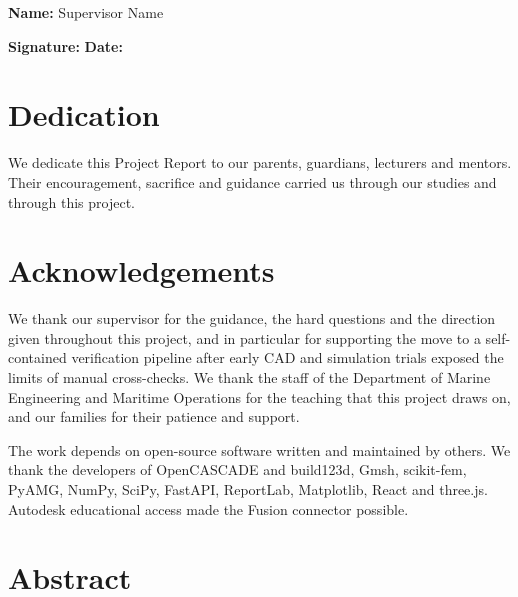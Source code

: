 \documentclass[12pt,a4paper]{report}
\begin{document}
\vspace{0.8cm}
\noindent
\textbf{Name:} Supervisor Name

\vspace{1cm}
\noindent
\textbf{Signature:} \underline{\hspace{5cm}}
\hfill
\textbf{Date:} \underline{\hspace{4cm}}

\clearpage

\chapter*{Dedication}

We dedicate this Project Report to our parents, guardians, lecturers and
mentors. Their encouragement, sacrifice and guidance carried us through our
studies and through this project.

\clearpage

\chapter*{Acknowledgements}

We thank our supervisor for the guidance, the hard questions and the
direction given throughout this project, and in particular for supporting the
move to a self-contained verification pipeline after early CAD and simulation
trials exposed the limits of manual cross-checks. We
thank the staff of the Department of Marine Engineering and Maritime
Operations for the teaching that this project draws on, and our families for
their patience and support.

The work depends on open-source software written and maintained by others.
We thank the developers of OpenCASCADE and build123d, Gmsh, scikit-fem,
PyAMG, NumPy, SciPy, FastAPI, ReportLab, Matplotlib, React and three.js.
Autodesk educational access made the Fusion connector possible.

\clearpage

\chapter*{Abstract}



\clearpage
\tableofcontents
\clearpage
\listoffigures
\clearpage
\listoftables
\clearpage
\end{document}
